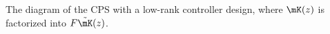 {The diagram of the CPS with a low-rank controller design, where $\mK(z)$ is factorized into $F\tilde \mK(z)$.}
    \label{fig:factorization}